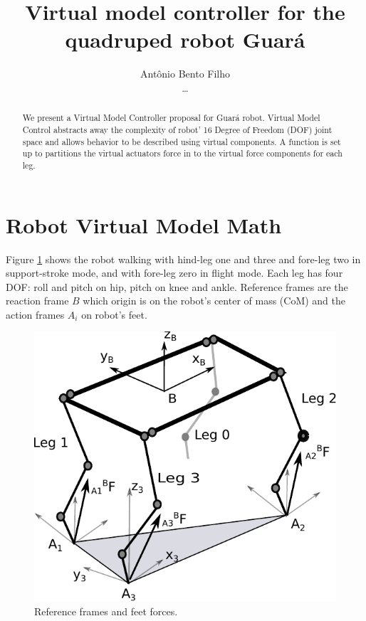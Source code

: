 \documentclass[]{article}
\title{Virtual model controller for the quadruped robot Guar\'a}
\author{Antônio Bento Filho\\\dots}
\begin{document}
\maketitle

\begin{abstract}
We present a Virtual Model Controller \cite{pratt_virtual_1996} proposal for Guará robot. Virtual Model Control abstracts away the complexity of robot' 16 Degree of Freedom (DOF) joint space and allows behavior to be described using virtual components. A function is set up to partitions the virtual actuators force in to the virtual force components for each leg.
\end{abstract}
\section{Robot Virtual Model Math}
Figure \ref{fig:guarawolflegs} shows the robot walking with hind-leg one and three  and fore-leg two in support-stroke mode, and with fore-leg zero in flight mode. Each leg has four DOF: roll and pitch on hip, pitch on knee and ankle. Reference frames are the reaction frame $B$ which origin is on the robot's center of mass (CoM) and the action frames $A_i$ on robot's feet.	
\begin{figure}%
	\centering
	\includegraphics[scale=0.5]{"Figuras/GuaraWolfLegs"}
	\caption{Reference frames and feet forces.}
	\label{fig:guarawolflegs}
\end{figure}
\end{document}
